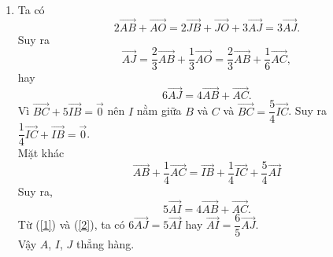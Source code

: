 \begin{bt}
{\begin{enumerate}
\begin{equation*}
			\end{equation*}
			Ta có
			\begin{equation*}
				\overrightarrow{M A}+\overrightarrow{M B}+\overrightarrow{M C}+\overrightarrow{M D}=4\overrightarrow{MO}+(\overrightarrow{OA}+\overrightarrow{OC})+(\overrightarrow{OB}+\overrightarrow{OD})=4\overrightarrow{MO}.
			\end{equation*}
			\item Ta có
			\begin{equation*}
				2\overrightarrow{AB}+\overrightarrow{AO} = 2\overrightarrow{JB}+\overrightarrow{JO}+3\overrightarrow{AJ}=3\overrightarrow{AJ}.
			\end{equation*}
			Suy ra
			\begin{equation*}
				\overrightarrow{AJ}=\dfrac{2}{3}\overrightarrow{AB}+\dfrac{1}{3}\overrightarrow{AO}=\dfrac{2}{3}\overrightarrow{AB}+\dfrac{1}{6}\overrightarrow{AC},
			\end{equation*}
			hay
			\begin{equation}\label{1}
				6\overrightarrow{AJ}=4\overrightarrow{AB}+\overrightarrow{AC}.
			\end{equation}
			Vì $\overrightarrow{BC}+5\overrightarrow{IB}=\overrightarrow{0}$ nên $I$ nằm giữa $B$ và $C$ và $\overrightarrow{BC}=\dfrac{5}{4}\overrightarrow{IC}$. Suy ra $\dfrac{1}{4}\overrightarrow{IC}+\overrightarrow{IB}= \overrightarrow{0}$.\\
			Mặt khác
			\begin{equation*}
				\overrightarrow{AB}+\dfrac{1}{4}\overrightarrow{AC}=\overrightarrow{IB}+\dfrac{1}{4}\overrightarrow{IC}+\dfrac{5}{4}\overrightarrow{AI}
			\end{equation*}
			Suy ra,
			\begin{equation}\label{2}
				5\overrightarrow{AI} = 4\overrightarrow{AB}+\overrightarrow{AC}.
			\end{equation}
			Từ (\ref{1}) và (\ref{2}), ta có $6\overrightarrow{AJ}=5\overrightarrow{AI}$ hay $\overrightarrow{AI}=\dfrac{6}{5}\overrightarrow{AJ}$.\\
			Vậy $A$, $I$, $J$ thẳng hàng.
		\end{enumerate}
	}
\end{bt}

